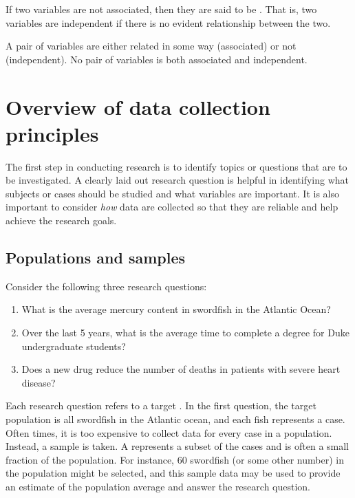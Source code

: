 If two variables are not associated, then they are said to be . That is, two variables are independent if there is no evident relationship between the two.

\begin{termBox}{
A pair of variables are either related in some way (associated) or not (independent). No pair of variables is both associated and independent.}
\end{termBox}


\section[Overview of data collection principles]{Overview of data collection principles }
\label{overviewOfDataCollectionPrinciples}


The first step in conducting research is to identify topics or questions that are to be investigated. A clearly laid out research question is helpful in identifying what subjects or cases should be studied and what variables are important. It is also important to consider \emph{how} data are collected so that they are reliable and help achieve the research goals.

\subsection{Populations and samples}
\label{populationsAndSamples}

Consider the following three research questions:
\begin{enumerate}
\setlength{\itemsep}{0mm}
\item What is the average mercury content in swordfish in the Atlantic Ocean?
\item\label{timeToGraduationQuestionForUCLAStudents} Over the last 5 years, what is the average time to complete a degree for Duke undergraduate students?
\item\label{identifyPopulationOfStentStudy} Does a new drug reduce the number of deaths in patients with severe heart disease?
\end{enumerate}
Each research question refers to a target . In the first question, the target population is all swordfish in the Atlantic ocean, and each fish represents a case. Often times, it is too expensive to collect data for every case in a population. Instead, a sample is taken. A  represents a subset of the cases and is often a small fraction of the population. For instance, 60 swordfish (or some other number) in the population might be selected, and this sample data may be used to provide an estimate of the population average and answer the research question.

